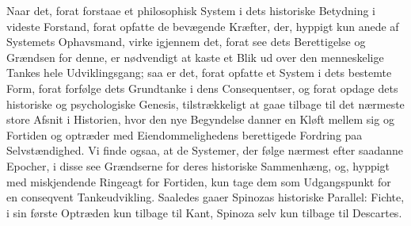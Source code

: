 \documentclass[12pt,a4paper]{book}
\newcommand{\opage}[1]{\marginnote{\footnotesize\textit{[#1]}}}
\begin{document}
\opage{17} %
Naar det, forat forstaae et philosophisk System i dets historiske
Betydning i videste Forstand, forat opfatte de bevægende Kræfter, der,
hyppigt kun anede af Systemets Ophavsmand, virke igjennem det, forat see
dets Berettigelse og Grændsen for denne, er nødvendigt at kaste et Blik
ud over den menneskelige Tankes hele Udviklingsgang; saa er det, forat
opfatte et System i dets bestemte Form, forat forfølge dets Grundtanke i
dens Consequentser, og forat opdage dets historiske og psychologiske
Genesis, tilstrækkeligt at gaae tilbage til det nærmeste store Afsnit i
Historien, hvor den nye Begyndelse danner en Kløft mellem sig og Fortiden
og optræder med Eiendommelighedens berettigede Fordring paa
Selvstændighed. Vi finde ogsaa, at de Systemer, der følge nærmest efter
saadanne Epocher, i disse see Grændserne for deres historiske
Sammenhæng, og, hyppigt med miskjendende Ringeagt for Fortiden, kun tage
dem som Udgangspunkt for en conseqvent Tankeudvikling. Saaledes gaaer
Spinozas historiske Parallel: Fichte, i sin første Optræden kun tilbage
til Kant, Spinoza selv kun tilbage til Descartes.
\end{document}
